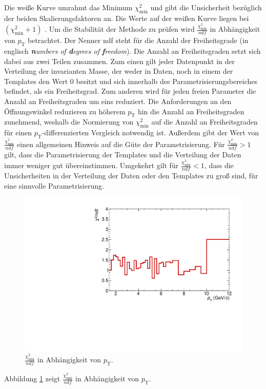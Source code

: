 Die weiße Kurve umrahmt das Minimum $\chi^{2}_\text{min}$ und gibt die Unsicherheit bezüglich der beiden Skalierungsfaktoren an.
Die Werte auf der weißen Kurve liegen bei $\left(\chi^{2}_\text{min}+1\right)$ \cite{book:chi2}.
\newline
Um die Stabilität der Methode zu prüfen wird $\frac{\chi^{2}_\text{min}}{ndf}$ in Abhängigkeit von $p_{\text{T}}$ betrachtet.
Der Nenner ndf steht für die Anzahl der Freiheitsgrade (in englisch \textit{\textbf{n}umbers of \textbf{d}egrees of \textbf{f}reedom}).
Die Anzahl an Freiheitsgraden setzt sich dabei aus zwei Teilen zusammen.
Zum einen gilt jeder Datenpunkt in der Verteilung der invarianten Masse, der weder in Daten, noch in einem der Templates den Wert 0 besitzt und sich innerhalb des Parametrisierungsbereiches befindet, als ein Freiheitsgrad.
Zum anderen wird für jeden freien Parameter die Anzahl an Freiheitsgraden um eins reduziert.
Die Anforderungen an den Öffnungswinkel reduzieren zu höherem $p_{\text{T}}$ hin die Anzahl an Freiheitsgraden zunehmend, weshalb die Normierung von $\chi^{2}_\text{min}$ auf die Anzahl an Freiheitsgraden für einen $p_{\text{T}}$-differenzierten Vergleich notwendig ist.
Außerdem gibt der Wert von $\frac{\chi^{2}_\text{min}}{ndf}$ einen allgemeinen Hinweis auf die Güte der Parametrisierung.
Für $\frac{\chi^{2}_\text{min}}{ndf} > 1$ gilt, dass die Parametrisierung der Templates und die Verteilung der Daten immer weniger gut übereinstimmen.
Umgekehrt gilt für $\frac{\chi^{2}_\text{min}}{ndf} < 1$, dass die Unsicherheiten in der Verteilung der Daten oder den Templates zu groß sind, für eine sinnvolle Parametrisierung.
\begin{figure}[tp]
\centering
\includegraphics[width=.65\linewidth]{Chi2NoComp_Data_2016.pdf}
\caption{$\frac{\chi^{2}_\text{min}}{ndf}$ in Abhängigkeit von $p_{\text{T}}$.
}
\label{fig:Chi2pT}
\end{figure}
\newline
Abbildung \ref{fig:Chi2pT} zeigt $\frac{\chi^{2}_\text{min}}{ndf}$ in Abhängigkeit von $p_{\text{T}}$.
